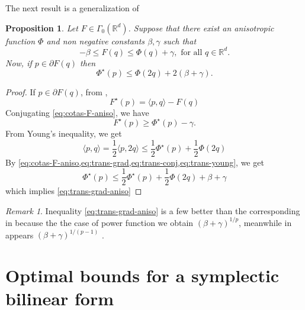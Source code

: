 \documentclass[twoside]{article}
\newtheorem{prop}[thm]{Proposition}
\theoremstyle{remark}
\newtheorem{comentario}{Remark}
\newcommand{\rr}{\mathbb{R}}
\renewcommand{\leq}{\leqslant}
\renewcommand{\geq}{\geqslant}
\newcommand{\Phie}{\Phi^{\star}}
\begin{document}
The next result is a generalization of \cite[Prop. 2.2, p.34]{mawhin2010critical}

\begin{prop}\label{prop: cota-conj-phi}
Let $F \in  \Gamma_0(\rr^d)$. Suppose that there exist an anisotropic function $\Phi$ and
non negative  constants $\beta,\gamma$ such that
\begin{equation}\label{eq:cotas-F-aniso}
-\beta \leq F(q) \leq \Phi(q)+\gamma, \mbox{ for all } q \in \rr^d. 
\end{equation}
Now, if $p \in \partial F(q)$ then 
\begin{equation}\label{eq:trans-grad-aniso}
\Phie(p)\leq \Phi(2q)+2(\beta+\gamma).
\end{equation}
\end{prop}

\begin{proof}
If $p \in \partial F(q)$, from \cite[Thm. 2.2, p.33]{mawhin2010critical}, 
\begin{equation}\label{eq:trans-grad}
F^\star(p)=\langle p,q \rangle-F(q)
\end{equation}
Conjugating \eqref{eq:cotas-F-aniso}, we have
\begin{equation}\label{eq:trans-conj}
F^\star(p)\geq \Phie(p)-\gamma.
\end{equation}
From Young's inequality, we get
\begin{equation}\label{eq:trans-young}
\langle p,q \rangle =\frac{1}{2} \langle p,2q \rangle \leq \frac{1}{2 }\Phie(p)+\frac{1}{2}\Phi(2q)
\end{equation}
By \cref{eq:cotas-F-aniso,eq:trans-grad,eq:trans-conj,eq:trans-young}, we get
\[
\Phie(p)\leq \frac{1}{2}\Phie(p)+\frac{1}{2}\Phi(2q)+\beta+\gamma
\]
which implies \eqref{eq:trans-grad-aniso}
\end{proof}

\begin{comentario}\label{com:mejora_desi} Inequality \eqref{eq:trans-grad-aniso} is a few better than the corresponding in \cite[Prop. 2.2]{mawhin2010critical} because the the case of power function  we obtain $(\beta+\gamma)^{1/p}$, meanwhile in \cite{mawhin2010critical} appears $(\beta+\gamma)^{1/(p-1)}$ .

\end{comentario}


\section{Optimal bounds for a symplectic bilinear form}
\end{document}
